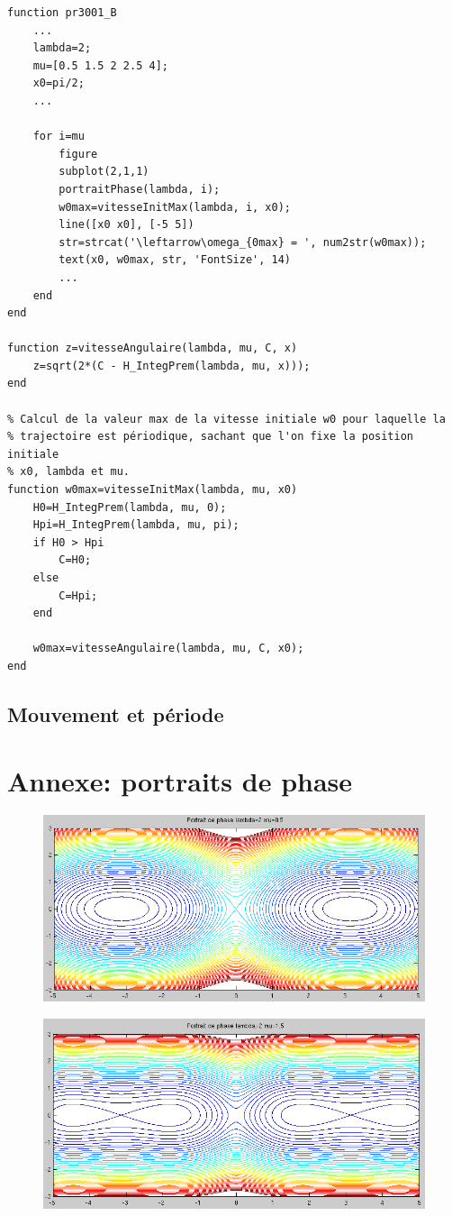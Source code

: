 \documentclass[11pt]{article}
\begin{document}
\begin{lstlisting}
function pr3001_B
    ...
    lambda=2;
    mu=[0.5 1.5 2 2.5 4];
    x0=pi/2;
    ...

    for i=mu
        figure
        subplot(2,1,1)
        portraitPhase(lambda, i);
        w0max=vitesseInitMax(lambda, i, x0);
        line([x0 x0], [-5 5])
        str=strcat('\leftarrow\omega_{0max} = ', num2str(w0max));
        text(x0, w0max, str, 'FontSize', 14)
        ...
    end
end

function z=vitesseAngulaire(lambda, mu, C, x)
    z=sqrt(2*(C - H_IntegPrem(lambda, mu, x)));
end

% Calcul de la valeur max de la vitesse initiale w0 pour laquelle la
% trajectoire est périodique, sachant que l'on fixe la position initiale
% x0, lambda et mu.
function w0max=vitesseInitMax(lambda, mu, x0)
    H0=H_IntegPrem(lambda, mu, 0);
    Hpi=H_IntegPrem(lambda, mu, pi);
    if H0 > Hpi
        C=H0;
    else
        C=Hpi;
    end

    w0max=vitesseAngulaire(lambda, mu, C, x0);
end
\end{lstlisting}
\newpage

\subsection{Mouvement et période}
\newpage

\appendix
\section{Annexe: portraits de phase}
\begin{figure}[h!]
	\centering
	\includegraphics[scale=0.64]{Figures/rapport_pp05.png}
\end{figure}

\begin{figure}[h!]
	\centering
	\includegraphics[scale=0.65]{Figures/rapport_pp15.png}
\end{figure}
\end{document}
